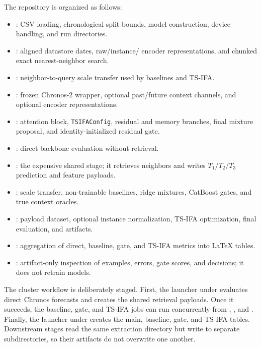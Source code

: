 \documentclass[11pt]{article}
\newcommand{\method}[1]{\texttt{#1}}
\begin{document}
The repository is organized as follows:
\begin{itemize}
  \item {}: CSV loading, chronological
  split bounds, model construction, device handling, and run directories.
  \item {}: aligned datastore dates, raw/instance/
  encoder representations, and chunked exact nearest-neighbor search.
  \item {}: neighbor-to-query scale transfer used by
  baselines and TS-IFA.
  \item {}: frozen Chronos-2 wrapper,
  optional past/future context channels, and optional encoder representations.
  \item {}: attention block, \method{TSIFAConfig},
  residual and memory branches, final mixture proposal, and identity-initialized
  residual gate.
  \item {}: direct backbone
  evaluation without retrieval.
  \item {}: the expensive shared stage;
  it retrieves neighbors and writes $T_1/T_2/T_3$ prediction and feature payloads.
  \item {}: scale transfer,
  non-trainable baselines, ridge mixtures, CatBoost gates, and true context oracles.
  \item {}: payload dataset, optional
  instance normalization, TS-IFA optimization, final evaluation, and artifacts.
  \item {}: aggregation of direct, baseline, gate,
  and TS-IFA metrics into LaTeX tables.
  \item {}: artifact-only inspection
  of examples, errors, gate scores, and decisions; it does not retrain models.
\end{itemize}

The cluster workflow is deliberately staged.  First, the
 launcher under 
evaluates direct Chronos forecasts and creates the shared retrieval payloads.  Once it succeeds, the
baseline, gate, and TS-IFA jobs can run concurrently from
, , and
.  Finally,
the  launcher under
 creates the main,
baseline, gate, and TS-IFA tables.  Downstream stages read the same extraction
directory but write to separate subdirectories, so their artifacts do not
overwrite one another.
\end{document}
